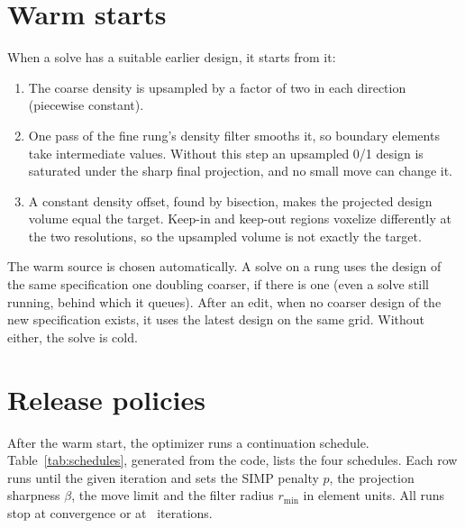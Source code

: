 \section{Warm starts}\label{sec:warm}
When a solve has a suitable earlier design, it starts from it:
\begin{enumerate}
  \item The coarse density is upsampled by a factor of two in each direction (piecewise constant).
  \item One pass of the fine rung's density filter smooths it, so boundary elements take intermediate values. Without
  this step an upsampled 0/1 design is saturated under the sharp final projection, and no small move can change it.
  \item A constant density offset, found by bisection, makes the projected design volume equal the target. Keep-in and
  keep-out regions voxelize differently at the two resolutions, so the upsampled volume is not exactly the target.
\end{enumerate}

The warm source is chosen automatically. A solve on a rung uses the design of the same specification one doubling
coarser, if there is one (even a solve still running, behind which it queues). After an edit, when no coarser design of
the new specification exists, it uses the latest design on the same grid. Without either, the solve is cold.

\section{Release policies}\label{sec:policies}
After the warm start, the optimizer runs a continuation schedule. Table~\ref{tab:schedules}, generated from the code,
lists the four schedules. Each row runs until the given iteration and sets the SIMP penalty $p$, the projection
sharpness $\beta$, the move limit and the filter radius $r_\mathrm{min}$ in element units. All runs stop at
convergence or at \MaxOuter\ iterations.

\begin{table}[htb]
\caption{Continuation schedules (from  and ).}\label{tab:schedules}

\end{table}

